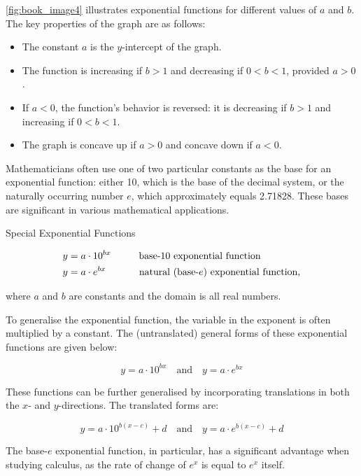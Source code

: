 \autoref{fig:book_image4} illustrates exponential functions for different values of \(a\) and \(b\). The key properties of the graph are as follows:
\begin{itemize}
    \item The constant \(a\) is the \(y\)-intercept of the graph.
    \item The function is increasing if \(b > 1\) and decreasing if \(0 < b < 1\), provided \(a > 0\).
    \item If \(a < 0\), the function's behavior is reversed: it is decreasing if \(b > 1\) and increasing if \(0 < b < 1\).
    \item The graph is concave up if \(a > 0\) and concave down if \(a < 0\).
\end{itemize}

Mathematicians often use one of two particular constants as the base for an exponential function: either 10, which is the base of the decimal system, or the naturally occurring number \( e \), which approximately equals 2.71828. These bases are significant in various mathematical applications.

\begin{definition}{Special Exponential Functions}

\begin{align*}
y &= a \cdot 10^{bx} \hspace{1cm} \text{base-10 exponential function} \\
y &= a \cdot e^{bx}  \hspace{1.2cm} \text{natural (base-}e\text{) exponential function,}
\end{align*}

where $a$ and $b$ are constants and the domain is all real numbers.
    
\end{definition}

To generalise the exponential function, the variable in the exponent is often multiplied by a constant. The (untranslated) general forms of these exponential functions are given below:

\[
y = a \cdot 10^{bx}
\quad \text{and} \quad
y = a \cdot e^{bx}
\]

These functions can be further generalised by incorporating translations in both the \(x\)- and \(y\)-directions. The translated forms are:

\[
y = a \cdot 10^{b(x - c)} + d
\quad \text{and} \quad
y = a \cdot e^{b(x - c)} + d
\]

The base-\(e\) exponential function, in particular, has a significant advantage when studying calculus, as the rate of change of \(e^x\) is equal to \(e^x\) itself.


